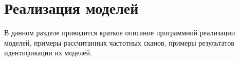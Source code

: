 \section{Реализация моделей}
	В данном разделе приводится краткое описание программной реализации
	моделей, примеры рассчитанных частотных сканов, примеры результатов
	идентификации их моделей.

	